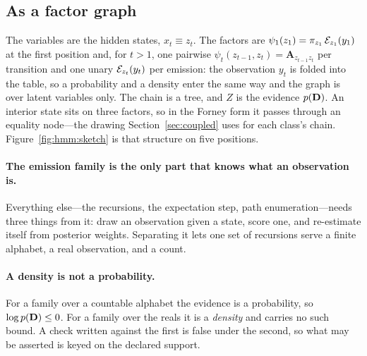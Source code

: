 \documentclass[11pt,a4paper]{article}
\begin{document}
\subsection{As a factor graph}
The variables are the hidden states, $x_t \equiv z_t$. The factors are
$\psi_1(z_1) = \pi_{z_1}\, \mathcal{E}_{z_1}(y_1)$ at the first position and,
for $t > 1$, one pairwise $\psi_t(z_{t-1}, z_t) = \mathbf{A}_{z_{t-1} z_t}$ per
transition and one unary $\mathcal{E}_{z_t}(y_t)$ per emission: the observation
$y_t$ is folded into the table, so a probability and a density enter the same
way and the graph is over latent variables only. The chain is a tree, and $Z$
is the evidence $p(\mathbf{D})$. An interior state sits on three factors, so in
the Forney form it passes through an equality node---the drawing
Section~\ref{sec:coupled} uses for each class's chain.
Figure~\ref{fig:hmm:sketch} is that structure on five positions.



\paragraph{The emission family is the only part that knows what an observation
is.} Everything else---the recursions, the expectation step, path
enumeration---needs three things from it: draw an observation given a state,
score one, and re-estimate itself from posterior weights. Separating it lets
one set of recursions serve a finite alphabet, a real observation, and a count.

\paragraph{A density is not a probability.} For a family over a countable
alphabet the evidence is a probability, so $\log p(\mathbf{D}) \le 0$. For a family
over the reals it is a \emph{density} and carries no such bound. A check
written against the first is false under the second, so what may be asserted is
keyed on the declared support.
\end{document}
